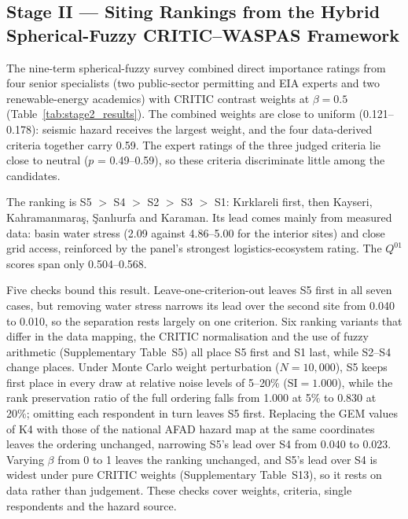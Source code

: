 \documentclass[preprint,12pt,authoryear]{elsarticle}
\begin{document}
\subsection{Stage II --- Siting Rankings from the Hybrid Spherical-Fuzzy CRITIC--WASPAS Framework}
\label{sec:stage2_results}
The nine-term spherical-fuzzy survey combined direct importance ratings from four senior specialists (two public-sector permitting and EIA experts and two renewable-energy academics) with CRITIC contrast weights at $\beta=0.5$ (Table~\ref{tab:stage2_results}). The combined weights are close to uniform (0.121--0.178): seismic hazard receives the largest weight, and the four data-derived criteria together carry 0.59. The expert ratings of the three judged criteria lie close to neutral ($p$ = 0.49--0.59), so these criteria discriminate little among the candidates.

The ranking is S5 $>$ S4 $>$ S2 $>$ S3 $>$ S1: Kırklareli first, then Kayseri, Kahramanmaraş, Şanlıurfa and Karaman. Its lead comes mainly from measured data: basin water stress (2.09 against 4.86--5.00 for the interior sites) and close grid access, reinforced by the panel's strongest logistics-ecosystem rating. The $Q^{01}$ scores span only 0.504--0.568.

Five checks bound this result. Leave-one-criterion-out leaves S5 first in all seven cases, but removing water stress narrows its lead over the second site from 0.040 to 0.010, so the separation rests largely on one criterion. Six ranking variants that differ in the data mapping, the CRITIC normalisation and the use of fuzzy arithmetic (Supplementary Table~S5) all place S5 first and S1 last, while S2--S4 change places. Under Monte Carlo weight perturbation ($N = 10{,}000$), S5 keeps first place in every draw at relative noise levels of 5--20\% ($\text{SI} = 1.000$), while the rank preservation ratio of the full ordering falls from 1.000 at 5\% to 0.830 at 20\%; omitting each respondent in turn leaves S5 first. Replacing the GEM values of K4 with those of the national AFAD hazard map at the same coordinates leaves the ordering unchanged, narrowing S5's lead over S4 from 0.040 to 0.023. Varying $\beta$ from 0 to 1 leaves the ranking unchanged, and S5's lead over S4 is widest under pure CRITIC weights (Supplementary Table~S13), so it rests on data rather than judgement. These checks cover weights, criteria, single respondents and the hazard source.
\end{document}
